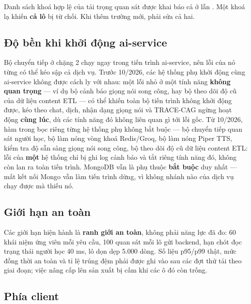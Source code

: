 \begin{luuy}
Danh sách khoá hợp lệ của tải trọng quan sát được khai báo cả ở
 lẫn
. Một khoá lạ khiến
\textbf{cả lô} bị từ chối. Khi thêm trường mới, phải sửa cả hai.
\end{luuy}

\subsection{Độ bền khi khởi động ai-service}

Bộ chuyển tiếp ở chặng 2 chạy ngay trong tiến trình ai-service, nên lỗi của nó từng có thể
kéo sập cả dịch vụ. Trước 10/2026, các hệ thống phụ khởi động cùng ai-service không được
cách ly với nhau: một lỗi nhỏ ở một tính năng \textbf{không quan trọng} — ví dụ bộ cảnh báo
giọng nói song công, hay bộ theo dõi độ cũ của dữ liệu content ETL — có thể khiến toàn bộ
tiến trình không khởi động được, kéo theo chat, dịch, nhận dạng giọng nói và TRACE-CAG
ngừng hoạt động \textbf{cùng lúc}, dù các tính năng đó không liên quan gì tới lỗi gốc. Từ
10/2026, hàm  trong  bọc riêng từng hệ thống
phụ không bắt buộc — bộ chuyển tiếp quan sát người học, bộ làm nóng vòng khoá Redis/Groq,
bộ làm nóng Piper TTS, kiểm tra độ sẵn sàng giọng nói song công, bộ theo dõi độ cũ dữ liệu
content ETL: lỗi của \textbf{một} hệ thống chỉ bị ghi log cảnh báo và tắt riêng tính năng
đó, không còn lan ra toàn tiến trình. MongoDB vẫn là phụ thuộc \textbf{bắt buộc} duy nhất —
mất kết nối Mongo vẫn làm tiến trình dừng, vì không nhánh nào của dịch vụ chạy được mà
thiếu nó.

\subsection{Giới hạn an toàn}

Các giới hạn hiện hành là \textbf{ranh giới an toàn}, không phải năng lực đã đo:
60 khái niệm ứng viên mỗi yêu cầu, 100 quan sát mỗi lô gửi backend, hạn chót đọc trạng
thái người học 40 ms, lô dọn dẹp 5.000 dòng. Số liệu p95/p99 thật, mức đồng thời an toàn
và tỉ lệ trúng đệm phải được ghi vào
 sau các đợt thử tải theo giai đoạn; việc
nâng cấp lên sản xuất bị cấm khi các ô đó còn trống.

\subsection{Phía client}

